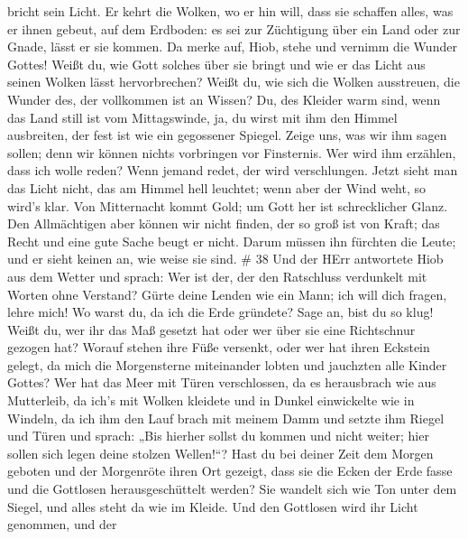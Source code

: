 bricht sein Licht.  Er kehrt die Wolken, wo er hin will,
dass sie schaffen alles, was er ihnen gebeut, auf dem Erdboden:
 es sei zur Züchtigung über ein Land oder zur Gnade, lässt
er sie kommen.  Da merke auf, Hiob, stehe und vernimm die
Wunder Gottes!  Weißt du, wie Gott solches über sie bringt
und wie er das Licht aus seinen Wolken lässt hervorbrechen?
 Weißt du, wie sich die Wolken ausstreuen, die Wunder des,
der vollkommen ist an Wissen?  Du, des Kleider warm sind,
wenn das Land still ist vom Mittagswinde,  ja, du wirst mit
ihm den Himmel ausbreiten, der fest ist wie ein gegossener Spiegel.
 Zeige uns, was wir ihm sagen sollen; denn wir können
nichts vorbringen vor Finsternis.  Wer wird ihm erzählen,
dass ich wolle reden? Wenn jemand redet, der wird verschlungen.
 Jetzt sieht man das Licht nicht, das am Himmel hell
leuchtet; wenn aber der Wind weht, so wird's klar.  Von
Mitternacht kommt Gold; um Gott her ist schrecklicher Glanz.
 Den Allmächtigen aber können wir nicht finden, der so groß
ist von Kraft; das Recht und eine gute Sache beugt er nicht.
 Darum müssen ihn fürchten die Leute; und er sieht keinen
an, wie weise sie sind. \# 38  Und der HErr antwortete Hiob
aus dem Wetter und sprach:  Wer ist der, der den Ratschluss
verdunkelt mit Worten ohne Verstand?  Gürte deine Lenden wie
ein Mann; ich will dich fragen, lehre mich!  Wo warst du, da
ich die Erde gründete? Sage an, bist du so klug!  Weißt du,
wer ihr das Maß gesetzt hat oder wer über sie eine Richtschnur gezogen
hat?  Worauf stehen ihre Füße versenkt, oder wer hat ihren
Eckstein gelegt,  da mich die Morgensterne miteinander
lobten und jauchzten alle Kinder Gottes?  Wer hat das Meer
mit Türen verschlossen, da es herausbrach wie aus Mutterleib,
 da ich's mit Wolken kleidete und in Dunkel einwickelte wie
in Windeln,  da ich ihm den Lauf brach mit meinem Damm und
setzte ihm Riegel und Türen  und sprach: „Bis hierher
sollst du kommen und nicht weiter; hier sollen sich legen deine stolzen
Wellen!{}``?  Hast du bei deiner Zeit dem Morgen geboten
und der Morgenröte ihren Ort gezeigt,  dass sie die Ecken
der Erde fasse und die Gottlosen herausgeschüttelt werden? 
Sie wandelt sich wie Ton unter dem Siegel, und alles steht da wie im
Kleide.  Und den Gottlosen wird ihr Licht genommen, und der
